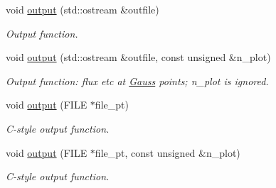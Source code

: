 \begin{DoxyCompactItemize}
void \hyperlink{classoomph_1_1FourierDecomposedHelmholtzFluxFromNormalDisplacementBCElement_a3846857ca5fe15cc5c8020d8f0117b67}{output} (std\+::ostream \&outfile)
\begin{DoxyCompactList}\small\item\em Output function. \end{DoxyCompactList}\item 
void \hyperlink{classoomph_1_1FourierDecomposedHelmholtzFluxFromNormalDisplacementBCElement_ac69b78e1f4cf73d3dbe07d8e1dbfe0b1}{output} (std\+::ostream \&outfile, const unsigned \&n\+\_\+plot)
\begin{DoxyCompactList}\small\item\em Output function\+: flux etc at \hyperlink{classoomph_1_1Gauss}{Gauss} points; n\+\_\+plot is ignored. \end{DoxyCompactList}\item 
void \hyperlink{classoomph_1_1FourierDecomposedHelmholtzFluxFromNormalDisplacementBCElement_aab3531a5a9c6a1a1fb4d2e9051e22c7e}{output} (F\+I\+LE $\ast$file\+\_\+pt)
\begin{DoxyCompactList}\small\item\em C-\/style output function. \end{DoxyCompactList}\item 
void \hyperlink{classoomph_1_1FourierDecomposedHelmholtzFluxFromNormalDisplacementBCElement_a982a948fa62759e5cb2e7953bb891602}{output} (F\+I\+LE $\ast$file\+\_\+pt, const unsigned \&n\+\_\+plot)
\begin{DoxyCompactList}\small\item\em C-\/style output function. \end{DoxyCompactList}\end{DoxyCompactItemize}
